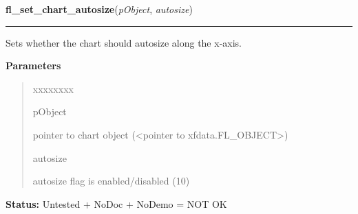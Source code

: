 \hspace{.8\funcindent}\begin{boxedminipage}{\funcwidth}

    \raggedright \textbf{fl\_set\_chart\_autosize}(\textit{pObject}, \textit{autosize})

    \vspace{-1.5ex}

    \rule{\textwidth}{0.5\fboxrule}
\setlength{\parskip}{2ex}
    Sets whether the chart should autosize along the x-axis.

\setlength{\parskip}{1ex}
      \textbf{Parameters}
      \vspace{-1ex}

      \begin{quote}
        \begin{Ventry}{xxxxxxxx}

          \item[pObject]

          pointer to chart object ({\textless}pointer to 
          xfdata.FL\_OBJECT{\textgreater})

          \item[autosize]

          autosize flag is enabled/disabled (1{\textbar}0)

        \end{Ventry}

      \end{quote}

\textbf{Status:} Untested + NoDoc + NoDemo = NOT OK



    \end{boxedminipage}

    \label{xformslib:library:fl_set_chart_lstyle}

    \vspace{0.5ex}

